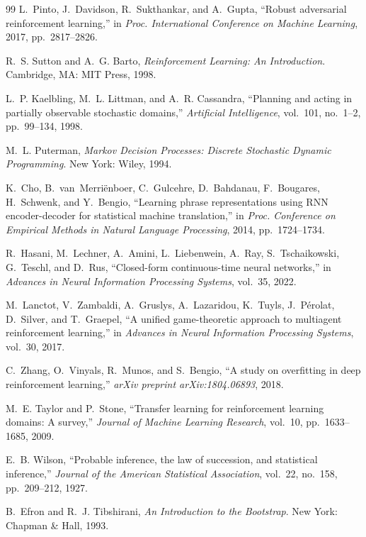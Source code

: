 \documentclass[conference]{IEEEtran}
\begin{document}
\begin{thebibliography}{99}
L.~Pinto, J.~Davidson, R.~Sukthankar, and A.~Gupta, ``Robust adversarial reinforcement learning,'' in \emph{Proc. International Conference on Machine Learning}, 2017, pp.~2817--2826.

R.~S. Sutton and A.~G. Barto, \emph{Reinforcement Learning: An Introduction}. Cambridge, MA: MIT Press, 1998.

L.~P. Kaelbling, M.~L. Littman, and A.~R. Cassandra, ``Planning and acting in partially observable stochastic domains,'' \emph{Artificial Intelligence}, vol.~101, no.~1--2, pp.~99--134, 1998.

M.~L. Puterman, \emph{Markov Decision Processes: Discrete Stochastic Dynamic Programming}. New York: Wiley, 1994.

K.~Cho, B.~van~Merri\"{e}nboer, C.~Gulcehre, D.~Bahdanau, F.~Bougares, H.~Schwenk, and Y.~Bengio, ``Learning phrase representations using RNN encoder-decoder for statistical machine translation,'' in \emph{Proc. Conference on Empirical Methods in Natural Language Processing}, 2014, pp.~1724--1734.

R.~Hasani, M.~Lechner, A.~Amini, L.~Liebenwein, A.~Ray, S.~Tschaikowski, G.~Teschl, and D.~Rus, ``Closed-form continuous-time neural networks,'' in \emph{Advances in Neural Information Processing Systems}, vol.~35, 2022.

M.~Lanctot, V.~Zambaldi, A.~Gruslys, A.~Lazaridou, K.~Tuyls, J.~P\'{e}rolat, D.~Silver, and T.~Graepel, ``A unified game-theoretic approach to multiagent reinforcement learning,'' in \emph{Advances in Neural Information Processing Systems}, vol.~30, 2017.

C.~Zhang, O.~Vinyals, R.~Munos, and S.~Bengio, ``A study on overfitting in deep reinforcement learning,'' \emph{arXiv preprint arXiv:1804.06893}, 2018.

M.~E. Taylor and P.~Stone, ``Transfer learning for reinforcement learning domains: A survey,'' \emph{Journal of Machine Learning Research}, vol.~10, pp.~1633--1685, 2009.

E.~B. Wilson, ``Probable inference, the law of succession, and statistical inference,'' \emph{Journal of the American Statistical Association}, vol.~22, no.~158, pp.~209--212, 1927.

B.~Efron and R.~J. Tibshirani, \emph{An Introduction to the Bootstrap}. New York: Chapman \& Hall, 1993.


\end{thebibliography}
\end{document}
